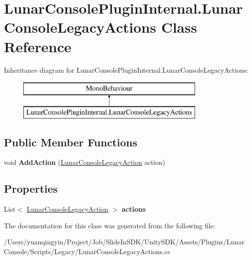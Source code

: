 \hypertarget{class_lunar_console_plugin_internal_1_1_lunar_console_legacy_actions}{}\section{Lunar\+Console\+Plugin\+Internal.\+Lunar\+Console\+Legacy\+Actions Class Reference}
\label{class_lunar_console_plugin_internal_1_1_lunar_console_legacy_actions}
Inheritance diagram for Lunar\+Console\+Plugin\+Internal.\+Lunar\+Console\+Legacy\+Actions\+:\begin{figure}[H]
\begin{center}
\leavevmode
\includegraphics[height=2.000000cm]{class_lunar_console_plugin_internal_1_1_lunar_console_legacy_actions}
\end{center}
\end{figure}
\subsection*{Public Member Functions}
\begin{DoxyCompactItemize}
\item 
\mbox{\label{class_lunar_console_plugin_internal_1_1_lunar_console_legacy_actions_a2a9744ba9b97c69054c6a9165427cf8b}} 
void {\bfseries Add\+Action} (\mbox{\hyperlink{class_lunar_console_plugin_internal_1_1_lunar_console_legacy_action}{Lunar\+Console\+Legacy\+Action}} action)
\end{DoxyCompactItemize}
\subsection*{Properties}
\begin{DoxyCompactItemize}
\item 
\mbox{\label{class_lunar_console_plugin_internal_1_1_lunar_console_legacy_actions_a50e0d8ff6877aea4f1c44ce85ce75d9f}} 
List$<$ \mbox{\hyperlink{class_lunar_console_plugin_internal_1_1_lunar_console_legacy_action}{Lunar\+Console\+Legacy\+Action}} $>$ {\bfseries actions}
\end{DoxyCompactItemize}


The documentation for this class was generated from the following file\+:\begin{DoxyCompactItemize}
\item 
/\+Users/yuanqingyin/\+Project/\+Job/\+Slide\+In\+S\+D\+K/\+Unity\+S\+D\+K/\+Assets/\+Plugins/\+Lunar\+Console/\+Scripts/\+Legacy/Lunar\+Console\+Legacy\+Actions.\+cs\end{DoxyCompactItemize}
